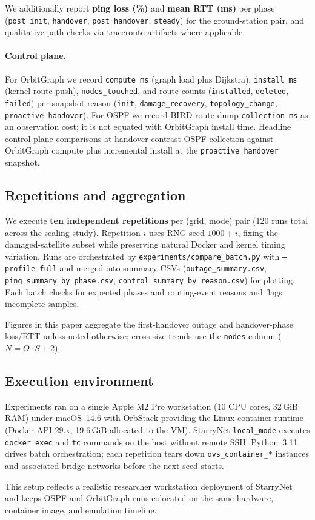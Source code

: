 We additionally report \textbf{ping loss (\%)} and \textbf{mean RTT (ms)} per
phase (\texttt{post\_init}, \texttt{handover}, \texttt{post\_handover},
\texttt{steady}) for the ground-station pair, and qualitative path checks via
traceroute artifacts where applicable.

\paragraph{Control plane.}
For OrbitGraph we record \texttt{compute\_ms} (graph load plus Dijkstra),
\texttt{install\_ms} (kernel route push), \texttt{nodes\_touched}, and route
counts (\texttt{installed}, \texttt{deleted}, \texttt{failed}) per snapshot
reason (\texttt{init}, \texttt{damage\_recovery}, \texttt{topology\_change},
\texttt{proactive\_handover}).
For OSPF we record BIRD route-dump \texttt{collection\_ms} as an observation
cost; it is not equated with OrbitGraph install time.
Headline control-plane comparisons at handover contrast OSPF collection against
OrbitGraph compute plus incremental install at the \texttt{proactive\_handover}
snapshot.

\subsection{Repetitions and aggregation}

We execute \textbf{ten independent repetitions} per (grid, mode) pair
(120 runs total across the scaling study).
Repetition $i$ uses RNG seed $1000 + i$, fixing the damaged-satellite subset
while preserving natural Docker and kernel timing variation.
Runs are orchestrated by \texttt{experiments/compare\_batch.py} with
\texttt{--profile full} and merged into summary CSVs
(\texttt{outage\_summary.csv}, \texttt{ping\_summary\_by\_phase.csv},
\texttt{control\_summary\_by\_reason.csv}) for plotting.
Each batch checks for expected phases and routing-event reasons and flags
incomplete samples.

Figures in this paper aggregate the first-handover outage and handover-phase
loss/RTT unless noted otherwise; cross-size trends use the \texttt{nodes}
column ($N = O \cdot S + 2$).

\subsection{Execution environment}

Experiments ran on a single Apple M2 Pro workstation (10 CPU cores, 32\,GiB
RAM) under macOS~14.6 with OrbStack providing the Linux container runtime
(Docker API 29.x, 19.6\,GiB allocated to the VM).
StarryNet \texttt{local\_mode} executes \texttt{docker exec} and \texttt{tc}
commands on the host without remote SSH.
Python~3.11 drives batch orchestration; each repetition tears down
\texttt{ovs\_container\_*} instances and associated bridge networks before the
next seed starts.

This setup reflects a realistic researcher workstation deployment of
StarryNet~\cite{lai2023starrynet} and keeps OSPF and OrbitGraph runs colocated
on the same hardware, container image, and emulation timeline.
